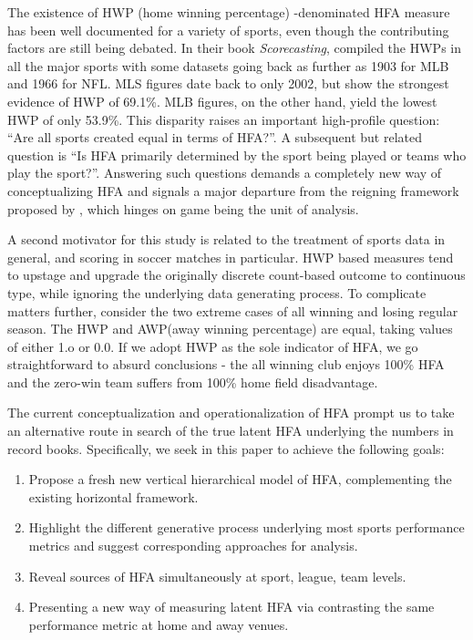 \documentclass[USenglish]{article}
\begin{document}
The existence of HWP (home winning percentage) -denominated HFA measure has been well documented for a variety of sports, even though the contributing factors are still being debated. In their book \textit{Scorecasting}, \cite{moskowitz2012scorecasting} compiled the HWPs in all the major sports with some datasets going back as further as 1903 for MLB and 1966 for NFL. MLS figures date back to only 2002, but show the strongest evidence of HWP of 69.1\%. MLB figures, on the other hand, yield the lowest HWP of only 53.9\%. This disparity raises an important high-profile question: ``Are all sports created equal in terms of HFA?''. A subsequent but related question is ``Is HFA primarily determined by the sport being played or teams who play the sport?''. Answering such questions demands a completely new way of conceptualizing HFA and signals a major departure from the reigning framework proposed by \cite{Courneya1992}, which hinges on game being the unit of analysis.  
 
A second motivator for this study is related to the treatment of sports data in general, and scoring in soccer matches in particular. HWP based measures tend to upstage and upgrade the originally discrete count-based outcome to continuous type, while ignoring the underlying data generating process. To complicate matters further, consider the two extreme cases of all winning and losing regular season. The HWP and AWP(away winning percentage) are equal, taking values of either 1.o or 0.0. If we adopt HWP as the sole indicator of HFA, we go straightforward to absurd conclusions - the all winning club enjoys 100\% HFA and the zero-win team suffers from 100\% home field disadvantage.   

The current conceptualization and operationalization of HFA prompt us to take an alternative route in search of the true latent HFA underlying the numbers in record books. Specifically, we seek in this paper to achieve the following goals: 

\begin{enumerate}
\item  Propose a fresh new vertical hierarchical model of HFA, complementing the existing horizontal framework.
\item Highlight the different generative process underlying most sports performance metrics and suggest corresponding approaches for analysis.
\item Reveal sources of HFA simultaneously at sport, league, team levels.
\item Presenting a new way of measuring latent HFA via contrasting the same performance metric at home and away venues. 
\end{enumerate}
\end{document}
